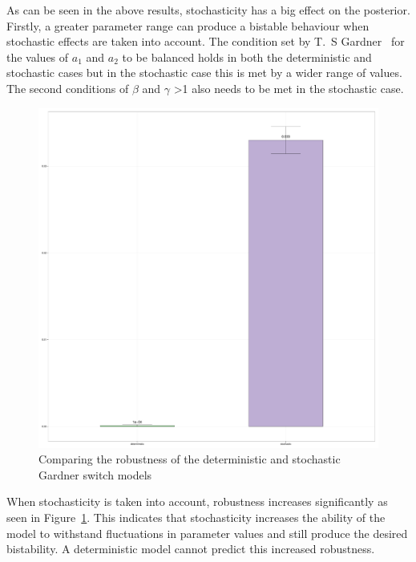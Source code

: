 As can be seen in the above results, stochasticity has a big effect on the posterior. Firstly, a greater parameter range can produce a bistable behaviour when stochastic effects are taken into account. The condition set by T.~S Gardner~\autocite{Gardner:2000vha} for the values of $a_1$ and $a_2$ to be balanced holds in both the deterministic and stochastic cases but in the stochastic case this is met by a wider range of values. The second conditions of $\beta$  and $\gamma$ \textgreater 1 also needs to be met in the stochastic case. 

\begin{figure}[p]
\centering
\includegraphics[scale=0.2]{chapterModelling/images/Gardner/robustness_comparison_high_mean.pdf}
\caption{Comparing the robustness of the deterministic and stochastic Gardner switch models}
\label{fig:Gard_robst}
\end{figure}

 When stochasticity is taken into account, robustness increases significantly as seen in Figure~\ref{fig:Gard_robst}. This indicates that stochasticity increases the ability of the model to withstand fluctuations in parameter values and still produce the desired bistability. A deterministic model cannot predict this increased robustness.


\newpage
